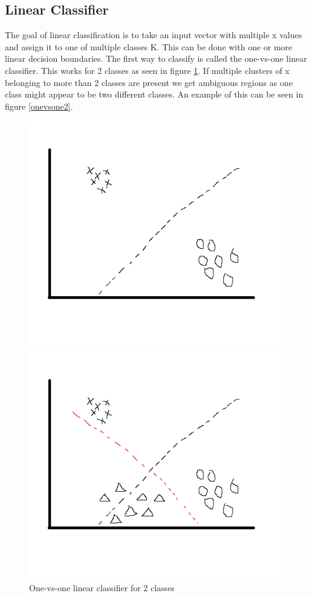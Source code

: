 \subsection{Linear Classifier}
The goal of linear classification is to take an input vector with multiple x values and assign it to one of multiple classes K. This can be done with one or more linear decision boundaries. The first way to classify is called the one-vs-one linear classifier. This works for 2 classes as seen in figure \ref{onevsone1}. If multiple clusters of x belonging to more than 2 classes are present we get ambiguous regions as one class might appear to be two different classes. An example of this can be seen in figure \ref{onevsone2}.
\begin{figure}[H]
\centering
\begin{minipage}[b]{0.5\textwidth}
\centering
\includegraphics[scale=0.5]{billeder/onevsone1}
\caption{One-vs-one linear classifier for 2 classes}
\label{onevsone1}
\end{minipage}%
\begin{minipage}[b]{0.5\textwidth}
\centering
\includegraphics[scale=0.5]{billeder/onevsone2}

\end{minipage}
\end{figure}
